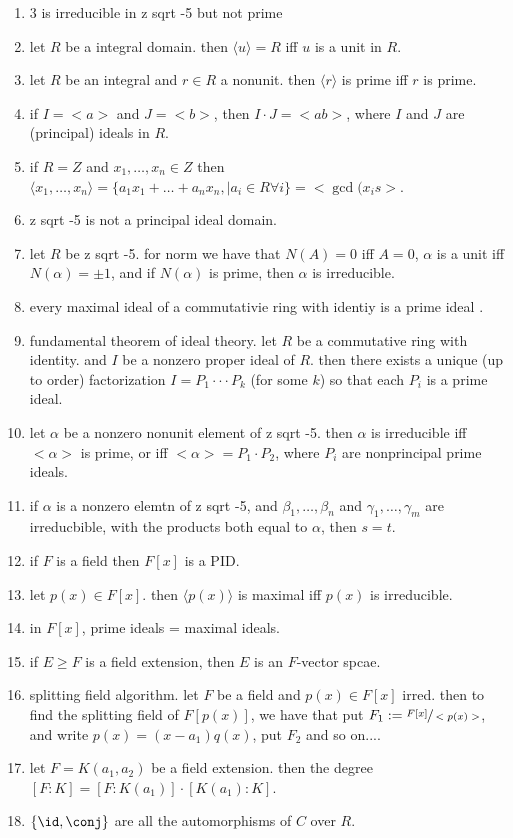 \begin{enumerate}
	\item $3$ is irreducible in z sqrt -5 but not prime
	\item let $R$ be a integral domain. then $\langle u \rangle = R$ iff $u$ is a unit in $R$. 
	\item let $R$ be an integral and $r \in R$ a nonunit. then $\langle r \rangle$ is prime iff $r$ is prime. 
	\item if $I = <a>$ and $J=<b>$, then $I \cdot J = <ab>$, where $I$ and $J$ are (principal) ideals in $R$. 
	\item if $R = Z$ and $x_1,\dots,x_n \in Z$ then $\langle x_1,\dots,x_n \rangle = \{a_1x_1 + \dots + a_nx_n, \mid a_i \in R \forall i\} = <\gcd(x_is>$. 
	\item z sqrt -5 is not a principal ideal domain. 
	\item let $R$ be z sqrt -5. for norm we have that $N(A) = 0$ iff $A = 0$, $\alpha$ is a unit iff $N(\alpha) = \pm 1$, and if $N(\alpha)$ is prime, then $\alpha$ is irreducible. 
	\item every maximal ideal of a commutativie ring with identiy is a prime ideal .
	\item fundamental theorem of ideal theory. let $R$ be a commutative ring with identity. and $I$ be a nonzero proper ideal of $R$. then there exists a unique (up to order) factorization $I = P_1 \cdot \cdot \cdot P_k$ (for some $k$) so that each $P_i$ is a prime ideal. 
	\item let $\alpha$ be a nonzero nonunit element of z sqrt -5. then $\alpha$ is irreducible iff $<\alpha>$ is prime, or iff $<\alpha> = P_1 \cdot P_2$, where $P_i$ are nonprincipal prime ideals. 	
	\item if $\alpha$ is a nonzero elemtn of z sqrt -5, and $\beta_1,\dots,\beta_n$ and $\gamma_1,\dots,\gamma_m$ are irreducbible, with the products both equal to $\alpha$, then $s=t$. 
	\item if $F$ is a field then $F[x]$ is a PID. 
	\item let $p(x) \in F[x]$. then $\langle p(x) \rangle$ is maximal iff $p(x)$ is irreducible. 
	\item in $F[x]$, prime ideals = maximal ideals. 
	\item if $E \geq F$ is a field extension, then $E$ is an $F$-vector spcae. 
	\item splitting field algorithm. let $F$ be a field and $p(x) \in F[x]$ irred. then to find the splitting field of $F[p(x)]$, we have that put $F_1 := \sfrac{F[x]}{<p(x)>}$, and write $p(x) = (x-a_1)q(x)$, put $F_2$ and so on.... 
	\item let $F=K(a_1,a_2)$ be a field extension. then the degree $[F:K] = [F:K(a_1)] \cdot [K(a_1):K]$. 
	\item $\{\id,\conj\}$ are all the automorphisms of $C$ over $R$. 
\end{enumerate}


